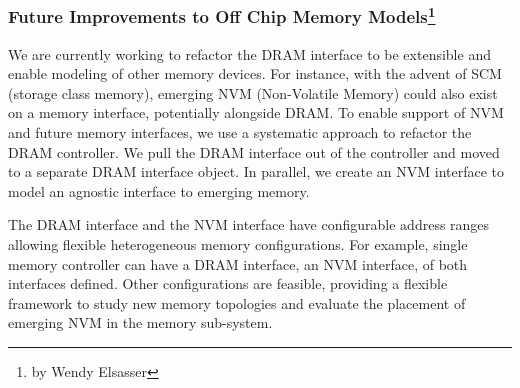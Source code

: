 \subsubsection[Future Improvements to Off Chip Memory Models]{Future Improvements to Off Chip Memory Models\footnote{by Wendy Elsasser}}
\label{sec:nvm}

We are currently working to refactor the DRAM interface to be extensible and enable modeling of other memory devices.
For instance, with the advent of SCM (storage class memory), emerging NVM (Non-Volatile Memory) could also exist on a memory interface, potentially alongside DRAM.
To enable support of NVM and future memory interfaces, we use a systematic approach to refactor the DRAM controller.
We pull the DRAM interface out of the controller and moved to a separate DRAM interface object.
In parallel, we create an NVM interface to model an agnostic interface to emerging memory.

The DRAM interface and the NVM interface have configurable address ranges allowing flexible heterogeneous memory configurations.
For example, single memory controller can have a DRAM interface, an NVM interface, of both interfaces defined.
Other configurations are feasible, providing a flexible framework to study new memory topologies and evaluate the placement of emerging NVM in the memory sub-system.
